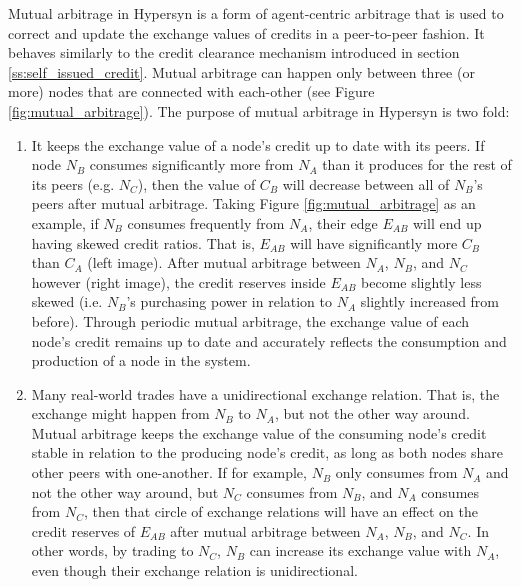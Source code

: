 \documentclass{article}
\begin{document}
Mutual arbitrage in Hypersyn is a form of agent-centric arbitrage that is used to correct and update the exchange values of credits in a peer-to-peer fashion. It behaves similarly to the credit clearance mechanism introduced in section \ref{ss:self_issued_credit}. Mutual arbitrage can happen only between three (or more) nodes that are connected with each-other (see Figure \ref{fig:mutual_arbitrage}). The purpose of mutual arbitrage in Hypersyn is two fold: 
\begin{enumerate}
    \item It keeps the exchange value of a node's credit up to date with its peers. If node $N_B$ consumes significantly more from $N_A$ than it produces for the rest of its peers (e.g. $N_C$), then the value of $C_B$ will decrease between all of $N_B$'s peers after mutual arbitrage. Taking Figure \ref{fig:mutual_arbitrage} as an example, if $N_B$ consumes frequently from $N_A$, their edge $E_{AB}$ will end up having skewed credit ratios. That is, $E_{AB}$ will have significantly more $C_B$ than $C_A$ (left image). After mutual arbitrage between $N_A$, $N_B$, and $N_C$ however (right image), the credit reserves inside $E_{AB}$ become slightly less skewed (i.e. $N_B$'s purchasing power in relation to $N_A$ slightly increased from before). Through periodic mutual arbitrage, the exchange value of each node's credit remains up to date and accurately reflects the consumption and production of a node in the system.
    \item Many real-world trades have a unidirectional exchange relation. That is, the exchange might happen from $N_B$ to $N_A$, but not the other way around. Mutual arbitrage keeps the exchange value of the consuming node's credit stable in relation to the producing node's credit, as long as both nodes share other peers with one-another. If for example, $N_B$ only consumes from $N_A$ and not the other way around, but $N_C$ consumes from $N_B$, and $N_A$ consumes from $N_C$, then that circle of exchange relations will have an effect on the credit reserves of $E_{AB}$ after mutual arbitrage between $N_A$, $N_B$, and $N_C$. In other words, by trading to $N_C$, $N_B$ can increase its exchange value with $N_A$, even though their exchange relation is unidirectional.
\end{enumerate}
\end{document}
